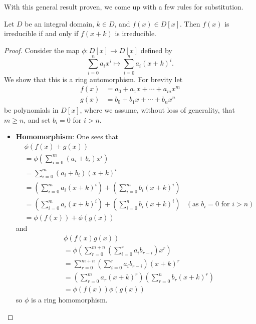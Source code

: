 With this general result proven, we come up with a few rules for substitution.

\begin{corollary}\label{corollary-irreducible-iff-translation-is-irreducible}
    Let $D$ be an integral domain, $k \in D$, and $f(x) \in D[x]$. Then $f(x)$ is irreducible if and only if $f(x + k)$ is irreducible.
\end{corollary}
\begin{proof}
    Consider the map $\phi: D[x] \to D[x]$ defined by
    \[
        \sum_{i=0}^n a_ix^i \mapsto \sum_{i=0}^na_i(x+k)^i.
    \]
    We show that this is a ring automorphism. For brevity let
    \begin{align*}
        f(x) &= a_0 + a_1x + \cdots + a_mx^m\\
        g(x) &= b_0 + b_1x + \cdots + b_nx^n
    \end{align*}
    be polynomials in $D[x]$, where we assume, without loss of generality, that $m \geq n$, and set $b_i = 0$ for $i > n$.
    \begin{itemize}
        \item \textbf{Homomorphism}: One sees that
        \begin{align*}
            &\phi(f(x) + g(x))\\
            &= \phi\left(\sum_{i=0}^m(a_i+b_i)x^i\right)\\
            &= \sum_{i=0}^m(a_i+b_i)(x+k)^i\\
            &= \left(\sum_{i=0}^ma_i(x+k)^i\right) + \left(\sum_{i=0}^mb_i(x+k)^i\right)\\
            &= \left(\sum_{i=0}^ma_i(x+k)^i\right) + \left(\sum_{i=0}^nb_i(x+k)^i\right) & (\text{as } b_i = 0 \text{ for } i > n)\\
            &= \phi(f(x)) + \phi(g(x))
        \end{align*}
        and
        \begin{align*}
            &\phi(f(x)g(x))\\
            &= \phi\left(\sum_{r=0}^{m+n}\left(\sum_{i=0}^ra_ib_{r-i}\right)x^r\right)\\
            &= \sum_{r=0}^{m+n}\left(\sum_{i=0}^ra_ib_{r-i}\right)(x+k)^r\\
            &= \left(\sum_{r=0}^ma_r(x+k)^r\right)\left(\sum_{r=0}^nb_r(x+k)^r\right)\\
            &= \phi(f(x))\phi(g(x))
        \end{align*}
        so $\phi$ is a ring homomorphism.


\end{itemize}
\end{proof}
